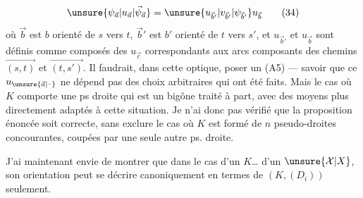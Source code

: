 \[\unsure{\psi_{\vec a}|u_{\vec a}|\vec\psi_{\vec a}}=\unsure{u_{\vec b'}|v_{\vec b'}|\psi_{\vec b'}}u_{\vec b}\tag*{(34)}\]
où $\vec b$ est $b$ orienté de $s$ vers $t$, $\vec b'$ est $b'$ orienté
de $t$ vers $s'$, et $u_{\vec b'}$ et $u_{\vec b}$ sont définis
comme composés des $u_{\vec c}$ correspondants
aux arcs  composants des chemins $\overrightarrow{(s,t)}$ et $\overrightarrow{(t,s')}$.
Il faudrait, dans cette optique, poser un
(A5) — savoir que ce $u_{\unsure{\vec a|\text{--}}}$ ne dépend pas des
choix arbitraires qui ont été faits. Mais
le cas où $K$ comporte une ps droite qui
est un bigône  
traité à part, avec des moyens plus
directement adaptés à cette situation. Je
n'ai donc pas vérifié que la proposition
énoncée soit correcte, sans exclure le
cas où $K$ est formé de $n$ pseudo-droites
concourantes, coupées par une seule
autre ps. droite.

J'ai maintenant envie de montrer
que dans le cas d'un $K$\ldots {} d'un $\unsure{\mathcal X|X}$,
son orientation peut se décrire canoniquement
en termes de $(K,(D_i))$ seulement.
